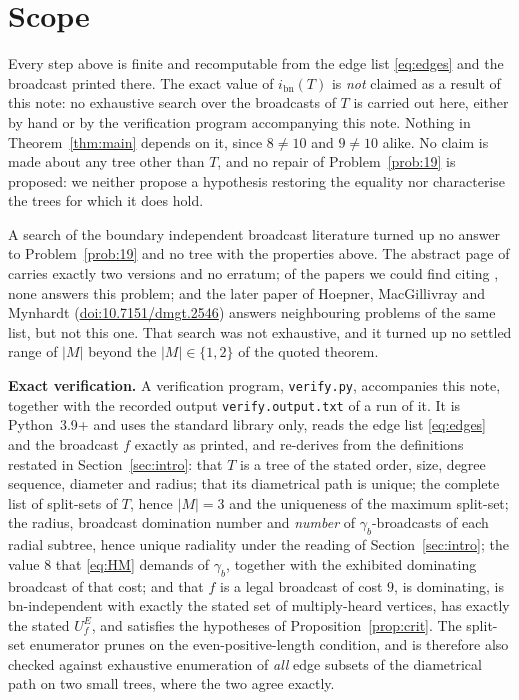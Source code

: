 \documentclass[11pt]{amsart}
\theoremstyle{definition}
\newcommand{\ibn}{i_{\mathrm{bn}}}
\newcommand{\gb}{\gamma_{b}}
\begin{document}
\section*{Scope}

Every step above is finite and recomputable from the edge list \eqref{eq:edges}
and the broadcast printed there. The exact value of $\ibn(T)$ is \emph{not}
claimed as a result of this note: no exhaustive search over the broadcasts of
$T$ is carried out here, either by hand or by the verification program
accompanying this note. Nothing in Theorem~\ref{thm:main} depends on it, since
$8\ne 10$ and $9\ne 10$ alike. No claim is made about any tree other than $T$,
and no repair of Problem~\ref{prob:19} is proposed: we neither propose a
hypothesis restoring the equality nor characterise the trees for which it does
hold.

A search of the boundary independent broadcast literature turned up no answer to
Problem~\ref{prob:19} and no tree with the properties above. The abstract page
of \cite{MM2021} carries exactly two versions and no erratum; of the papers we
could find citing \cite{MM2024}, none answers this problem; and the later paper
of Hoepner, MacGillivray and Mynhardt (\href{https://doi.org/10.7151/dmgt.2546}
{doi:10.7151/dmgt.2546}) answers neighbouring problems of the same list, but not
this one. That search was not exhaustive, and it turned up no settled range of
$|M|$ beyond the $|M|\in\{1,2\}$ of the quoted theorem.

\medskip
\noindent\textbf{Exact verification.}
A verification program, \texttt{verify.py}, accompanies this note, together with
the recorded output \texttt{verify.output.txt} of a run of it. It is
Python~3.9+ and uses the standard library only, reads the edge list
\eqref{eq:edges} and the broadcast $f$ exactly as printed, and re-derives from
the definitions restated in Section~\ref{sec:intro}: that $T$ is a tree of the
stated order, size, degree sequence, diameter and radius; that its diametrical
path is unique; the complete list of split-sets of $T$, hence $|M|=3$ and the
uniqueness of the maximum split-set; the radius, broadcast domination number and
\emph{number} of $\gb$-broadcasts of each radial subtree, hence unique radiality
under the reading of Section~\ref{sec:intro}; the value $8$ that \eqref{eq:HM}
demands of $\gb$, together with the exhibited dominating broadcast of that cost;
and that $f$ is a legal broadcast of cost $9$, is dominating, is bn-independent
with exactly the stated set of multiply-heard vertices, has exactly the stated
$U_f^{E}$, and satisfies the hypotheses of Proposition~\ref{prop:crit}. The
split-set enumerator prunes on the even-positive-length condition, and is
therefore also checked against exhaustive enumeration of \emph{all} edge subsets
of the diametrical path on two small trees, where the two agree exactly.
\end{document}
